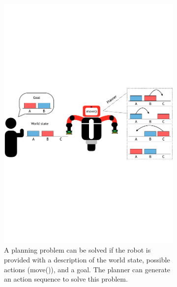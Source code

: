 \begin{figure}[htp]
	\centering
	
	\begin{subfigure}[t]{0.54\textwidth}
		\includegraphics[width=\textwidth]{figures/PbD-AutomatedPlanner}
		\caption{A planning problem can be solved if the robot is provided with a description of the world state, possible actions (\ie move()), and a goal. The planner can generate an action sequence to solve this problem.}
		\label{fig:Planning domain}
	\end{subfigure}
\hfill
	\begin{subfigure}[t]{0.44\textwidth}

\end{subfigure}
\end{figure}
